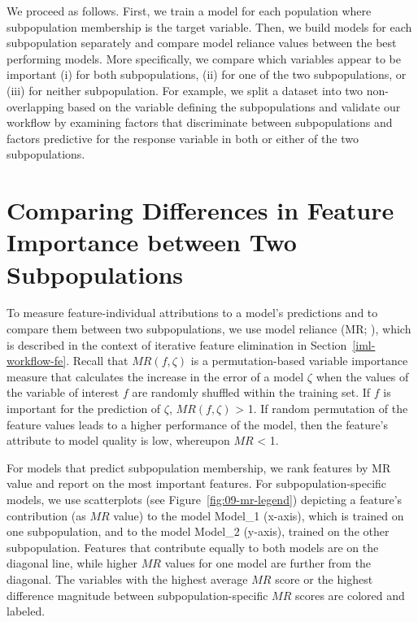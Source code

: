 \documentclass[
  oneside]{book}
\begin{document}
We proceed as follows.
First, we train a model for each population where subpopulation membership is the target variable.
Then, we build models for each subpopulation separately and compare model reliance values
between the best performing models.
More specifically, we compare which variables appear to be important (i) for both subpopulations, (ii) for one of the two subpopulations, or (iii) for neither subpopulation.
For example, we split a dataset into two non-overlapping based on the variable defining the subpopulations and validate our workflow by examining factors that discriminate between subpopulations and factors predictive for the response variable in both or either of the two subpopulations.

\hypertarget{gender-measure}{%
\section{Comparing Differences in Feature Importance between Two Subpopulations}\label{gender-measure}}

To measure feature-individual attributions to a model's predictions and to compare them between two subpopulations, we use model reliance (MR; \autocite{Fisher:ModelReliance2019}), which is described in the context of iterative feature elimination in Section~\ref{iml-workflow-fe}.
Recall that \(MR(f,\zeta)\) is a permutation-based variable importance measure that calculates the increase in the error of a model \(\zeta\) when the values of the variable of interest \(f\) are randomly shuffled within the training set.
If \(f\) is important for the prediction of \(\zeta\), \(MR(f,\zeta)\) \textgreater{} 1.
If random permutation of the feature values leads to a higher performance of the model, then the feature's attribute to model quality is low, whereupon \(MR\) \textless{} 1.

For models that predict subpopulation membership, we rank features by MR value and report on the most important features.
For subpopulation-specific models, we use scatterplots (see Figure~\ref{fig:09-mr-legend}) depicting a feature's contribution (as \(MR\) value) to the model Model\_1 (x-axis), which is trained on one subpopulation, and to the model Model\_2 (y-axis), trained on the other subpopulation.
Features that contribute equally to both models are on the diagonal line, while higher \(MR\) values for one model are further from the diagonal.
The variables with the highest average \(MR\) score or the highest difference magnitude between subpopulation-specific \(MR\) scores are colored and labeled.
\end{document}
